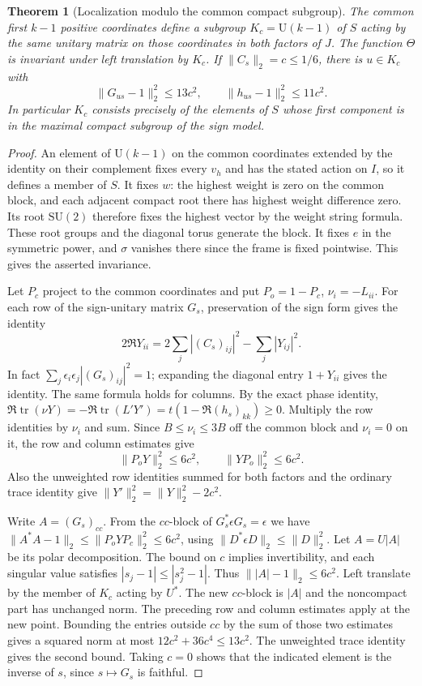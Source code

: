 \documentclass[a4paper,11pt]{article}
\newtheorem{theorem}[proposition]{Theorem}
\theoremstyle{definition}
\theoremstyle{remark}
\numberwithin{equation}{section}
\begin{document}
\begin{theorem}[Localization modulo the common compact subgroup]\leavevmode
\label{thm:angularlocalization696}
The common first \(k-1\) positive coordinates define a subgroup
\(K_c=\mathrm U(k-1)\) of \(S\) acting by the same unitary matrix
on those coordinates in both factors of \(J\). The function
\(\Theta\) is invariant under left translation by \(K_c\). If
\(\|C_s\|_2=c\le1/6\), there is \(u\in K_c\) with
\[
       \|G_{us}-1\|_2^2\le 13c^2,\qquad
       \|h_{us}-1\|_2^2\le 11c^2 .
\]
In particular \(K_c\) consists precisely of the elements
of \(S\) whose first component is in the maximal compact
subgroup of the sign model.
\end{theorem}
\begin{proof}
An element of \(\mathrm U(k-1)\) on the common coordinates
extended by the identity on their complement fixes every
\(v_h\) and has the stated action on \(I\), so it defines a
member of \(S\). It fixes \(w\): the highest weight is zero
on the common block, and each adjacent compact root there has
highest weight difference zero. Its root \(\mathrm{SU}(2)\)
therefore fixes the highest vector by the weight string
formula. These root groups and the diagonal torus generate
the block. It fixes \(e\) in the symmetric power, and
\(\sigma\) vanishes there since the frame is fixed pointwise.
This gives the asserted invariance.

Let \(P_c\) project to the common coordinates and put
\(P_o=1-P_c\), \(\nu_i=-L_{ii}\). For each row of the
sign-unitary matrix \(G_s\), preservation of the sign form
gives the identity
\[
   2\Re Y_{ii}
      =2\sum_j |(C_s)_{ij}|^2-\sum_j |Y_{ij}|^2 .
\]
In fact \(\sum_j\epsilon_i\epsilon_j|(G_s)_{ij}|^2=1\);
expanding the diagonal entry \(1+Y_{ii}\) gives the identity.
The same formula holds for columns. By the exact phase
identity,
\(\Re\operatorname{tr}(\nu Y)
=-\Re\operatorname{tr}(L'Y')=t(1-\Re(h_s)_{kk})\ge0\).
Multiply the row identities by \(\nu_i\) and sum. Since
\(B\le\nu_i\le3B\) off the common block and \(\nu_i=0\) on
it, the row and column estimates give
\[
       \|P_oY\|_2^2\le6c^2,\qquad \|YP_o\|_2^2\le6c^2 .
\]
Also the unweighted row identities summed for both factors
and the ordinary trace identity give
\(\|Y'\|_2^2=\|Y\|_2^2-2c^2\).

Write \(A=(G_s)_{cc}\). From the \(cc\)-block of
\(G_s^*\epsilon G_s=\epsilon\) we have
\(\|A^*A-1\|_2\le\|P_oYP_c\|_2^2\le6c^2\), using
\(\|D^*\epsilon D\|_2\le\|D\|_2^2\).
Let \(A=U|A|\) be its polar decomposition. The bound on
\(c\) implies invertibility, and each singular value satisfies
\(|s_j-1|\le|s_j^2-1|\). Thus
\(\||A|-1\|_2\le6c^2\). Left translate by the member of
\(K_c\) acting by \(U^*\). The new \(cc\)-block is \(|A|\)
and the noncompact part has unchanged norm. The preceding
row and column estimates apply at the new point. Bounding
the entries outside \(cc\) by the sum of those two estimates
gives a squared norm at most \(12c^2+36c^4\le13c^2\).
The unweighted trace identity gives the second bound.
Taking \(c=0\) shows that the indicated element is the
inverse of \(s\), since \(s\mapsto G_s\) is faithful.
\end{proof}
\end{document}
